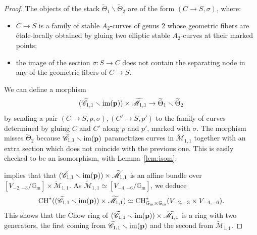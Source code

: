 \documentclass[a4paper, 10pt]{amsart}
\numberwithin{equation}{section}
\numberwithin{subsection}{section}
\theoremstyle{definition}
\theoremstyle{remark}
\renewcommand{\mathcal}{\mathscr}
\newcommand\GG{\mathbb{G}} \newcommand\HH{\mathbb{H}}
\newcommand\rmm{\mathrm{m}} \newcommand\rmn{\mathrm{n}}
\newcommand\arr{\ifinner\to\else\longrightarrow\fi}
\newcommand\im[1]{\operatorname{im}(#1)}
\renewcommand{\setminus}{\smallsetminus}
\newcommand{\gm}{\GG_{\rmm}}
\newcommand{\Mtilde}{\widetilde{\mathcal M}}
\newcommand{\Ctilde}{\widetilde{\mathcal C}}
\newcommand{\ThTilde}{\widetilde{\Theta}}
\newcommand{\ch}[1][*]{\operatorname{CH}^{#1}}
\begin{document}
	\begin{proof}
		The objects of the stack $\ThTilde_1\smallsetminus\ThTilde_2$ are of the form $(C\to S,\sigma)$, where:
		\begin{itemize}
			\item $C\to S$ is a family of stable $A_2$-curves of genus $2$ whose geometric fibers are \'{e}tale-locally obtained by gluing two elliptic stable $A_2$-curves at their marked points;
			\item the image of the section $\sigma:S\to C$ does not contain the separating node in any of the geometric fibers of $C\to S$.
		\end{itemize}
		We can define a morphism
		\[ (\Ctilde_{1,1}\smallsetminus \im{\bfp})\times\Mtilde_{1,1}\arr \ThTilde_1\smallsetminus\ThTilde_2 \]
		by sending a pair $(C\to S,p,\sigma),(C'\to S,p')$ to the family of curves determined by gluing $C$ and $C'$ along $p$ and $p'$, marked with $\sigma$. The morphism misses $\ThTilde_2$ because $\Ctilde_{1,1}\setminus \im\bfp$ parametrizes curves in $\Mtilde_{1,1}$ together with an extra section which does not coincide with the previous one. This is easily checked to be an isomorphism, with Lemma~\ref{lem:isom}.
		
		
		 implies that that $(\Ctilde_{1,1}\smallsetminus\im{\bfp})\times\Mtilde_{1,1}$ is an affine bundle over $[V_{-2,-3}/\gm]\times\Mtilde_{1,1}$. As $\Mtilde_{1,1}\simeq [V_{-4,-6}/\gm]$, we deduce
		\[ \ch((\Ctilde_{1,1}\smallsetminus\im{\bfp})\times\Mtilde_{1,1})\simeq \ch_{\gm\times\gm}(V_{-2,-3}\times V_{-4,-6}). \]
		This shows that the Chow ring of $(\Ctilde_{1,1}\smallsetminus\im{\bfp})\times\Mtilde_{1,1}$ is a ring with two generators, the first coming from $\Ctilde_{1,1}\smallsetminus\im{\bfp}$ and the second from $\Mtilde_{1,1}$.
		

\end{proof}
\end{document}
